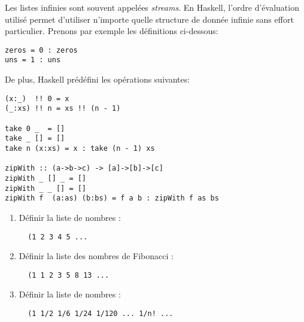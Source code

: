 \begin{Exercise}[title={Vers l'infini et plus loin encore !}]
Les listes infinies sont souvent appelées \emph{streams}.  En Haskell,
l'ordre d'évaluation utilisé permet d'utiliser n'importe quelle structure de
donnée infinie sans effort particulier.  Prenons par exemple les définitions
ci-dessous:
\begin{verbatim}
zeros = 0 : zeros
uns = 1 : uns
\end{verbatim}

De plus, Haskell prédéfini les opérations suivantes:
\begin{verbatim}
(x:_)  !! 0 = x
(_:xs) !! n = xs !! (n - 1)

take 0 _  = []
take _ [] = []
take n (x:xs) = x : take (n - 1) xs

zipWith :: (a->b->c) -> [a]->[b]->[c]
zipWith _ [] _ = []
zipWith _ _ [] = []
zipWith f  (a:as) (b:bs) = f a b : zipWith f as bs
\end{verbatim}

\begin{enumerate}
\item Définir  la liste de nombres :
\begin{verbatim}
  (1 2 3 4 5 ...
\end{verbatim}
\item Définir  la liste des nombres de Fibonacci :
\begin{verbatim}
  (1 1 2 3 5 8 13 ...
\end{verbatim}
\item Définir  la liste de nombres :
\begin{verbatim}
  (1 1/2 1/6 1/24 1/120 ... 1/n! ...
\end{verbatim}
\end{enumerate}
\end{Exercise}